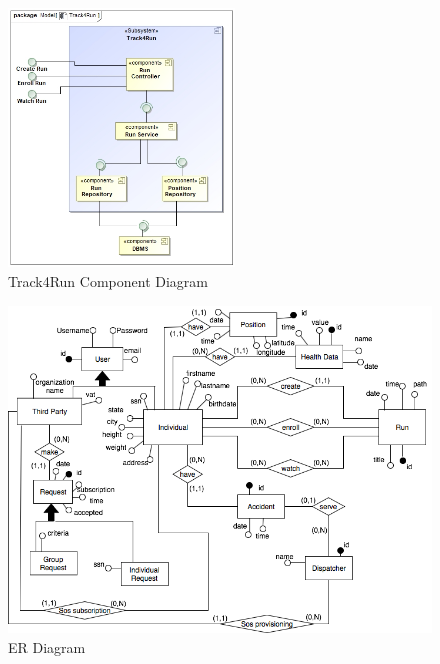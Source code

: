 \documentclass[a4paper]{article}
\begin{document}
\begin{figure}[!htpb]
    \centering
    \includegraphics[width=60mm,keepaspectratio]{DD/images/UML/component_Track4Run.jpg}
    \caption{Track4Run Component Diagram}
    \label{fig:component_track4run}
\end{figure}
\begin{figure}[!htpb]
    \centering
    \includegraphics[width=\textwidth,keepaspectratio]{DD/images/er_diagram.png}
    \caption{ER Diagram}
    \label{fig:ER_trackme}
\end{figure}
\newpage
\end{document}
